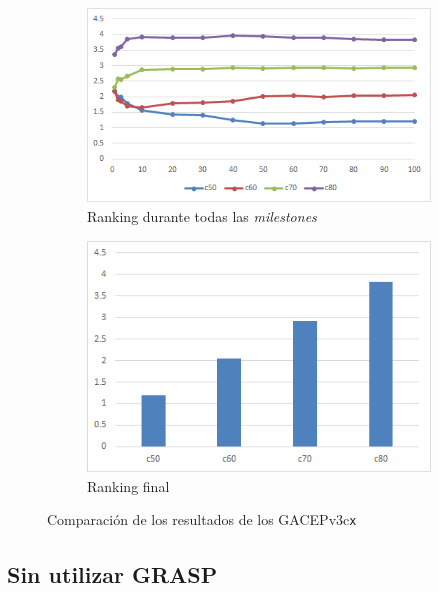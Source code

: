 \begin{figure}[h]
     \centering
     \begin{subfigure}[b]{0.45\textwidth}
         \centering
         \includegraphics[width=\textwidth]{imagenes/Experimental/GACEPcGRASP.png}
         \caption{Ranking durante todas las \textit{milestones}}
         \label{fig:GACEPv3cGRASP_lineas}
     \end{subfigure}
     \hfill
     \begin{subfigure}[b]{0.45\textwidth}
         \centering
         \includegraphics[width=\textwidth]{imagenes/Experimental/barras/GACEPcGRASP.png}
         \caption{Ranking final}
         \label{fig:GACEPv3cGRASP_barras}
     \end{subfigure}
        \caption{Comparación de los resultados de los GACEPv3c\texttt{x}}
        \label{fig:GACEPcGRASP}
\end{figure}

\subsection{Sin utilizar GRASP}

